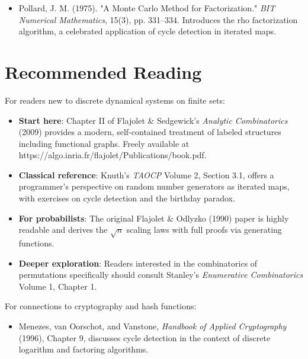 \begin{itemize}
\item Pollard, J. M. (1975). "A Monte Carlo Method for Factorization." \textit{BIT Numerical Mathematics}, 15(3), pp. 331--334. Introduces the rho factorization algorithm, a celebrated application of cycle detection in iterated maps.
\end{itemize}



\section{Recommended Reading}

For readers new to discrete dynamical systems on finite sets:

\begin{itemize}
\item \textbf{Start here}: Chapter II of Flajolet \& Sedgewick's \textit{Analytic Combinatorics} (2009) provides a modern, self-contained treatment of labeled structures including functional graphs. Freely available at https://algo.inria.fr/flajolet/Publications/book.pdf.
\end{itemize}

\begin{itemize}
\item \textbf{Classical reference}: Knuth's \textit{TAOCP} Volume 2, Section 3.1, offers a programmer's perspective on random number generators as iterated maps, with exercises on cycle detection and the birthday paradox.
\end{itemize}

\begin{itemize}
\item \textbf{For probabilists}: The original Flajolet \& Odlyzko (1990) paper is highly readable and derives the $\sqrt{n}$ scaling laws with full proofs via generating functions.
\end{itemize}

\begin{itemize}
\item \textbf{Deeper exploration}: Readers interested in the combinatorics of permutations specifically should consult Stanley's \textit{Enumerative Combinatorics} Volume 1, Chapter 1.
\end{itemize}

For connections to cryptography and hash functions:

\begin{itemize}
\item Menezes, van Oorschot, and Vanstone, \textit{Handbook of Applied Cryptography} (1996), Chapter 9, discusses cycle detection in the context of discrete logarithm and factoring algorithms.
\end{itemize}
